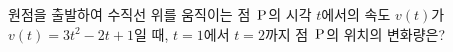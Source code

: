 원점을 출발하여 수직선 위를 움직이는 점~$\mathrm{P}$의 시각 $t$에서의 속도 $v(t)$가 $v(t)=3t^2-2t+1$일 때, $t=1$에서 $t=2$까지 점~$\mathrm{P}$의 위치의 변화량은?
